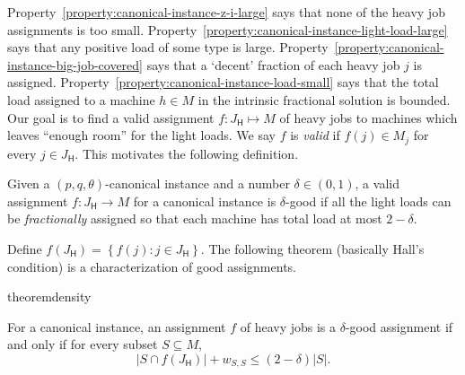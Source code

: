 \documentclass[11pt]{article}
\newenvironment{definition}{\begin{Definition}}{\end{Definition}}
\newtheorem{definition}[lemma]{Definition}
\newcounter{prop}
\newcommand{\set}[1]{\left\{#1\right\}}
\newcommand{\cardinal}[1]{\left|#1\right|}
\newcommand{\sfH}{{\mathsf H}}
\begin{document}
Property~\ref{property:canonical-instance-z-i-large} says that none of the heavy job assignments is too small.  Property~\ref{property:canonical-instance-light-load-large} says that any positive load of some type is large. Property~\ref{property:canonical-instance-big-job-covered} says that  a `decent' fraction of each heavy job $j$ is assigned. Property~\ref{property:canonical-instance-load-small} says that the total load assigned to a machine $h \in M$ in the intrinsic fractional solution is bounded.
Our goal is to find a valid assignment $f:J_\sfH \mapsto M$ of heavy jobs to machines which leaves ``enough room'' for the light loads. We say $f$ is {\em valid} if $f(j) \in M_j$ for every $j \in J_\sfH$. This motivates the following definition.

\begin{definition}[$\delta$-good Assignment]
Given a $(p, q, \theta)$-canonical instance and a number $\delta \in (0, 1)$,  a valid assignment $f:J_\sfH\to M$ for a canonical instance is $\delta$-good if all the light loads can be \emph{fractionally} assigned so that each machine has total load at most $2-\delta$.
\end{definition}
\noindent
Define $f({J_\sfH}) = \set{f(j):j\in {J_\sfH}}$. The following theorem (basically Hall's condition)
is a characterization of good assignments. 

\begin{restatable}{theorem}{density}
\label{thm:alpha-good-equivalent-to-no-bad-set}

For a canonical instance, an assignment $f$ of heavy jobs is a $\delta$-good assignment if and only if for every subset $S \subseteq M$,
\begin{equation}
\cardinal{S\cap f({J_\sfH})} + w_{S,S} \leq (2-\delta)|S|.  \label{equation:S-not-bad-for-f}
\end{equation}
\end{restatable}
\end{document}
